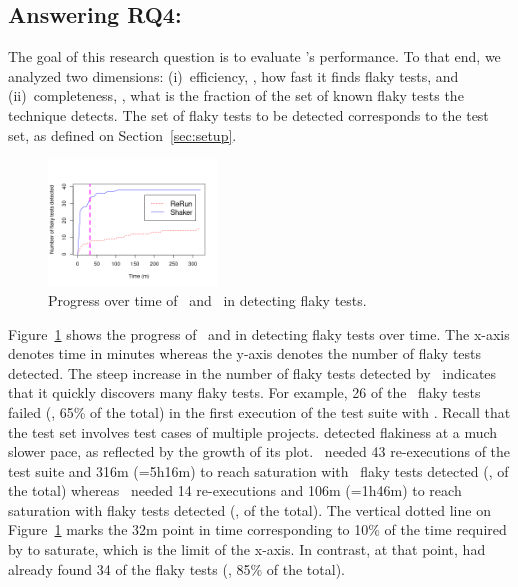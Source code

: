 \documentclass[conference]{IEEEtran}
\begin{document}
\subsection{Answering RQ4: \rqfour}
\label{sec:answer:rqfour}

The goal of this research question is to evaluate \tname{}'s performance. To that end, we analyzed two dimensions: (i)~efficiency, \ie{}, how fast it finds flaky tests, and (ii)~completeness, \ie{}, what is the fraction of the set of known flaky tests the technique detects. The set of flaky tests to be detected corresponds to the test set, as defined on Section~\ref{sec:setup}. 

\begin{figure}[t!]
    \centering
    \includegraphics[width=0.4\textwidth]{figs/auc.png}
    \vspace{-2ex}
    \caption{Progress over time of \tname\ and \rerun\ in detecting flaky tests.}
    \label{fig:auc}
    \vspace{-3ex}
\end{figure}

Figure~\ref{fig:auc} shows the progress of \tname\ and \rerun{} in detecting flaky tests over time. The x-axis denotes time in minutes whereas the y-axis denotes the number of flaky tests detected. The steep increase in the number of flaky tests detected by \tname\ indicates that it quickly discovers many flaky tests. For example, 26 of the \numflakytesting\ flaky tests failed (\ie{}, 65\% of the total) in the first execution of the test suite with \tname. Recall that the test set involves test cases of multiple projects. \rerun{} detected flakiness at a much slower pace, as reflected by the growth of its plot. \rerun\ needed 43 re-executions of the test suite and 316m (=5h16m) to reach saturation with \numFlakyDetectedReRun\ flaky tests detected (\ie{}, \percFlakyDetectedReRun{} of the total) whereas \tname\ needed 14 re-executions and 106m (=1h46m) to reach saturation with \numFlakyDetectedShaker{} flaky tests detected (\ie{}, \percFlakyDetectedShaker{} of the total). The vertical dotted line on Figure~\ref{fig:auc} marks the 32m point in time corresponding to 10\% of the time required by \rerun{} to saturate, which is the limit of the x-axis. In contrast, at that point, \tname{} had already found 34 of the flaky tests (\ie{}, 85\% of the total). 
\end{document}
